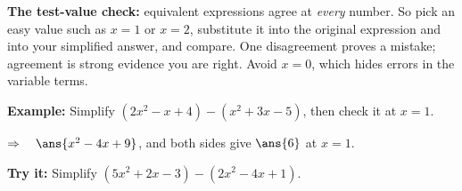 \documentclass[12pt]{article}
\begin{document}

\begin{formulabox}
\textbf{The test-value check:} equivalent expressions agree at \emph{every} number. So pick an easy
value such as $x = 1$ or $x = 2$, substitute it into the original expression and into your
simplified answer, and compare. One disagreement proves a mistake; agreement is strong evidence
you are right. Avoid $x = 0$, which hides errors in the variable terms.
\end{formulabox}

\begin{examplebox}
\textbf{Example:} \quad Simplify $(2x^2 - x + 4) - (x^2 + 3x - 5)$, then check it at $x = 1$.

$\Rightarrow\quad \ans{x^2 - 4x + 9}$, and both sides give $\ans{6}$ at $x = 1$.
\end{examplebox}

\begin{tryitbox}
\textbf{Try it:} \quad Simplify $(5x^2 + 2x - 3) - (2x^2 - 4x + 1)$.\\[2pt]
\end{tryitbox}
\end{document}
